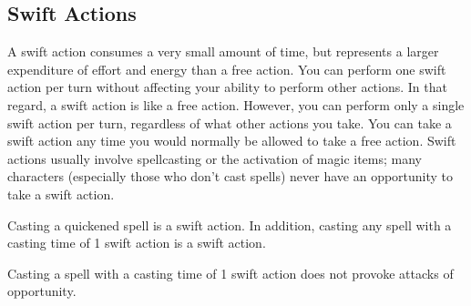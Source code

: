 
\subsection{Swift Actions}
A swift action consumes a very small amount of time, but represents a larger expenditure of effort and energy than a free action. You can perform one swift action per turn without affecting your ability to perform other actions. In that regard, a swift action is like a free action. However, you can perform only a single swift action per turn, regardless of what other actions you take. You can take a swift action any time you would normally be allowed to take a free action. Swift actions usually involve spellcasting or the activation of magic items; many characters (especially those who don't cast spells) never have an opportunity to take a swift action.

Casting a quickened spell is a swift action. In addition, casting any spell with a casting time of 1 swift action is a swift action.

Casting a spell with a casting time of 1 swift action does not provoke attacks of opportunity.
